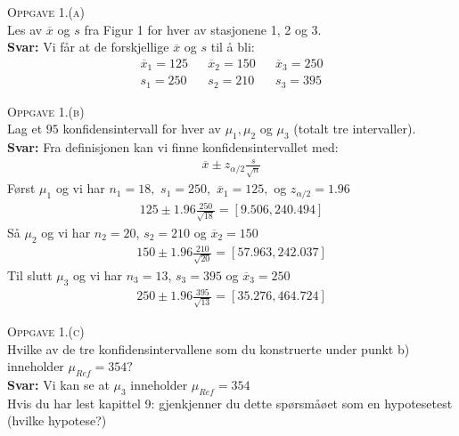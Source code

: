 \documentclass{article}
\date{}
\begin{document}
\textsc{Oppgave 1.(a)}\\
Les av $\overline{x}$ og $s$ fra Figur 1 for hver av stasjonene 1, 2 og 3. \\ 
\textbf{Svar:} Vi får at de forskjellige $\overline{x}$ og $s$ til å bli:
\begin{align*}
  \overline{x}_1=125 && \overline{x}_2 = 150 && \overline{x}_3=250\\ 
  s_1=250 && s_2=210 && s_3=395
\end{align*}

\textsc{Oppgave 1.(b)}\\
Lag et $95$ konfidensintervall for hver av $\mu_1, \mu_2$ og $\mu_3$ (totalt tre
intervaller).\\
\textbf{Svar:} Fra definisjonen kan vi finne konfidensintervallet med:
\begin{align*}
  \overline{x}\pm z_{\alpha/2}\frac{s}{\sqrt{n}}
\end{align*}
Først $\mu_1$ og vi har $n_1=18,$ $s_1=250,$ $\overline{x}_1=125,$ og $z_{\alpha/2}=1.96$
\begin{align*}
  125\pm 1.96 \frac{250}{\sqrt{18}}=[9.506,240.494]
\end{align*}
Så $\mu_2$ og vi har $n_2=20$, $s_2=210$ og $\overline{x}_2=150$
\begin{align*}
  150\pm 1.96 \frac{210}{\sqrt{20}}=[57.963, 242.037]
\end{align*}
Til slutt $\mu_3$ og vi har $n_3=13$, $s_3=395$ og $\overline{x}_3=250$
\begin{align*}
  250 \pm 1.96 \frac{395}{\sqrt{13}}=[35.276,464.724] 
\end{align*}

\textsc{Oppgave 1.(c)}\\
Hvilke av de tre konfidensintervallene som du konstruerte under punkt b)
inneholder $\mu_{Ref}=354?$\\
\textbf{Svar:} Vi kan se at $\mu_3$ inneholder $\mu_{Ref}=354$\\

Hvis du har lest kapittel 9: gjenkjenner du dette spørsmåøet som en hypotesetest
(hvilke hypotese?)\\
\end{document}
